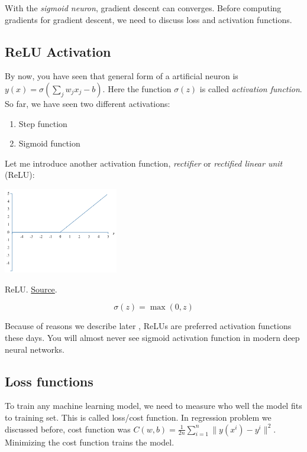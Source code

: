 \documentclass[a4paper]{tufte-handout}
\begin{document}
With the \emph{sigmoid neuron}, gradient descent can converges.
Before computing gradients for gradient descent, we need to discuss loss
and activation functions.

\subsection{ReLU Activation}

By now, you have seen that general form of a artificial neuron is
\(y(x) = \sigma\left(\sum_j w_j x_j - b\right)\).
Here the function \(\sigma(z)\) is called \emph{activation
function}. So far, we have seen two different activations:

\begin{enumerate}
\item
  Step function
\item
  Sigmoid function
\end{enumerate}


Let me introduce another activation function, \emph{rectifier} or
\emph{rectified linear unit} (ReLU):

\begin{marginfigure}
\includegraphics[width=50mm]{relu}
\caption{ ReLU.
\href{http://neuralnetworksanddeeplearning.com/chap3.html}{Source}. }
\end{marginfigure}

\[\sigma(z) = \max(0, z)\]

Because of reasons we describe later
,
ReLUs are preferred activation functions these days. You will almost
never see sigmoid activation function in modern deep neural networks.

\subsection{Loss functions}

To train any machine learning model, we need to measure who well 
the model fits to training set. This is called loss/cost
 function.
In regression problem we discussed before, cost function was 
\(C(w, b) = \frac{1}{2n} \sum_{i = 1}^{n} \| y(x^i) - y^i\|^2\). 
Minimizing the cost function trains the model.
\end{document}
